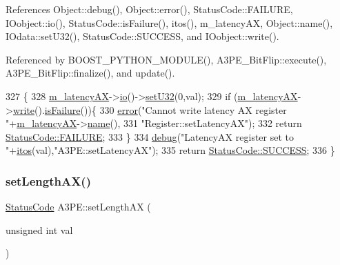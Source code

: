 References Object\+::debug(), Object\+::error(), Status\+Code\+::\+F\+A\+I\+L\+U\+RE, I\+Oobject\+::io(), Status\+Code\+::is\+Failure(), itos(), m\+\_\+latency\+AX, Object\+::name(), I\+Odata\+::set\+U32(), Status\+Code\+::\+S\+U\+C\+C\+E\+SS, and I\+Oobject\+::write().



Referenced by B\+O\+O\+S\+T\+\_\+\+P\+Y\+T\+H\+O\+N\+\_\+\+M\+O\+D\+U\+L\+E(), A3\+P\+E\+\_\+\+Bit\+Flip\+::execute(), A3\+P\+E\+\_\+\+Bit\+Flip\+::finalize(), and update().


\begin{DoxyCode}
327                                              \{
328   \hyperlink{classA3PE_a061472eb539bb6ac99f4fa11a760eeaf}{m\_latencyAX}->\hyperlink{classIOobject_af04fb94137c3d86849f478ac5afab5d1}{io}()->\hyperlink{classIOdata_abbed9a057203bc763f97b85fb385f36b}{setU32}(0,val);
329   \textcolor{keywordflow}{if} (\hyperlink{classA3PE_a061472eb539bb6ac99f4fa11a760eeaf}{m\_latencyAX}->\hyperlink{classIOobject_a9f6984bc9f0fadcf800f1be2523ac744}{write}().\hyperlink{classStatusCode_a5dd22dc6eb2c52fc4cabc58f6dea2eb7}{isFailure}())\{
330     \hyperlink{classObject_a204a95f57818c0f811933917a30eff45}{error}(\textcolor{stringliteral}{"Cannot write latency AX register "}+\hyperlink{classA3PE_a061472eb539bb6ac99f4fa11a760eeaf}{m\_latencyAX}->\hyperlink{classObject_a300f4c05dd468c7bb8b3c968868443c1}{name}(),
331         \textcolor{stringliteral}{"Register::setLatencyAX"});
332     \textcolor{keywordflow}{return} \hyperlink{classStatusCode_a6f565cbeadc76d14c72f047e5e85eb4ba3da73d4c469762eb9d3c960368252b26}{StatusCode::FAILURE};
333   \}
334   \hyperlink{classObject_aac010553f022165573714b7014a15f0d}{debug}(\textcolor{stringliteral}{"LatencyAX register set to "}+\hyperlink{Tools_8h_af330027dbdafb9a30768b3613c553e60}{itos}(val),\textcolor{stringliteral}{"A3PE::setLatencyAX"});
335   \textcolor{keywordflow}{return} \hyperlink{classStatusCode_a6f565cbeadc76d14c72f047e5e85eb4badd0da38d3ba0d922efd1f4619bc37ad8}{StatusCode::SUCCESS};
336 \}
\end{DoxyCode}
\mbox{\label{classA3PE_a0300aa5c5ed02b82275c1de434196b9a}} 
\subsubsection{\texorpdfstring{set\+Length\+A\+X()}{setLengthAX()}}
{\footnotesize\ttfamily \hyperlink{classStatusCode}{Status\+Code} A3\+P\+E\+::set\+Length\+AX (\begin{DoxyParamCaption}\item[{unsigned int}]{val }\end{DoxyParamCaption})}



